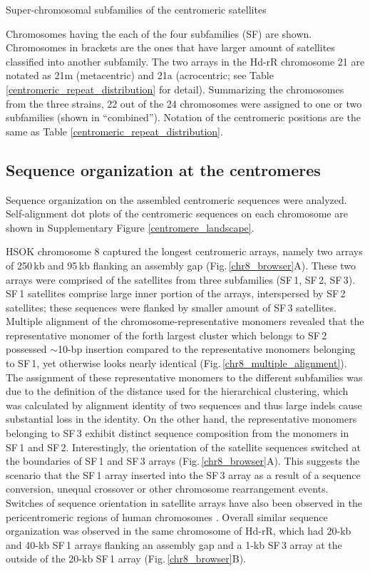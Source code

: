   \begin{table*}
    \centering
    \caption{Super-chromosomal subfamilies of the centromeric satellites}
    
    \label{super_chromosomal_subfamily}
    \caption*{{\small
      Chromosomes having the each of the four subfamilies (SF) are shown. Chromosomes in brackets are the ones that have larger amount of satellites classified into another subfamily. The two arrays in the Hd-rR chromosome 21 are notated as 21m (metacentric) and 21a (acrocentric; see Table \ref{centromeric_repeat_distribution} for detail). Summarizing the chromosomes from the three strains, 22 out of the 24 chromosomes were assigned to one or two subfamilies (shown in ``combined''). Notation of the centromeric positions are the same as Table \ref{centromeric_repeat_distribution}.
    }}
  \end{table*}


\subsection*{Sequence organization at the centromeres}
  Sequence organization on the assembled centromeric sequences were analyzed. Self-alignment dot plots of the centromeric sequences on each chromosome are shown in Supplementary Figure \ref{centromere_landscape}.

  HSOK chromosome 8 captured the longest centromeric arrays, namely two arrays of 250\,kb and 95\,kb flanking an assembly gap (Fig.\,\ref{chr8_browser}A). These two arrays were comprised of the satellites from three subfamilies (SF\,1, SF\,2, SF\,3). SF\,1 satellites comprise large inner portion of the arrays, interspersed by SF\,2 satellites; these sequences were flanked by smaller amount of SF\,3 satellites. Multiple alignment of the chromosome-representative monomers revealed that the representative monomer of the forth largest cluster which belongs to SF\,2 possessed $\sim$10-bp insertion compared to the representative monomers belonging to SF\,1, yet otherwise looks nearly identical (Fig.\,\ref{chr8_multiple_alignment}). The assignment of these representative monomers to the different subfamilies was due to the definition of the distance used for the hierarchical clustering, which was calculated by alignment identity of two sequences and thus large indels cause substantial loss in the identity. On the other hand, the representative monomers belonging to SF\,3 exhibit distinct sequence composition from the monomers in SF\,1 and SF\,2. Interestingly, the orientation of the satellite sequences switched at the boundaries of SF\,1 and SF\,3 arrays (Fig.\,\ref{chr8_browser}A). This suggests the scenario that the SF\,1 array inserted into the SF\,3 array as a result of a sequence conversion, unequal crossover or other chromosome rearrangement events. Switches of sequence orientation in satellite arrays have also been observed in the pericentromeric regions of human chromosomes \cite{M.KatharineRuddand2004}. Overall similar sequence organization was observed in the same chromosome of Hd-rR, which had 20-kb and 40-kb SF\,1 arrays flanking an assembly gap and a 1-kb SF\,3 array at the outside of the 20-kb SF\,1 array (Fig.\,\ref{chr8_browser}B).

